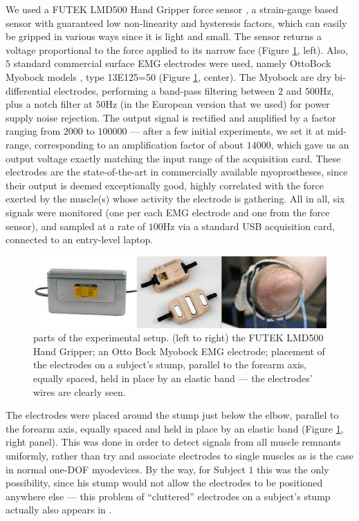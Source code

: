 We used a FUTEK LMD500 Hand Gripper force sensor \cite{futek}, a strain-gauge
based sensor with guaranteed low non-linearity and hysteresis factors, which can easily
be gripped in various ways since it is light and small. The sensor returns a
voltage proportional to the force applied to its narrow face (Figure \ref{fig:setup}, left).
Also, $5$ standard commercial surface EMG electrodes were used, namely OttoBock
Myobock models \cite{myobock}, type 13E125=50 (Figure \ref{fig:setup}, center).
The Myobock are dry bi-differential electrodes, performing a band-pass filtering between
$2$ and $500$Hz, plus a notch filter at $50$Hz (in the European version
that we used) for power supply noise rejection. The output signal is rectified
and amplified by a factor ranging from $2 000$ to $100 000$ --- after a few initial
experiments, we set it at mid-range, corresponding to an amplification factor of
about $14 000$, which gave us an output voltage exactly matching the input range of
the acquisition card.
These electrodes are the state-of-the-art in commercially available myoprostheses,
since their output is deemed exceptionally good, highly correlated with the
force exerted by the muscle(s) whose activity the electrode is gathering.
All in all, six signals were monitored (one per each EMG electrode and one from the
force sensor), and sampled at a rate of $100$Hz via a standard USB acquisition card,
connected to an entry-level laptop.

\begin{figure}[!ht] \centering
  \includegraphics[width=\textwidth]{figs/setup}
  \caption{parts of the experimental setup. (left to right) the FUTEK LMD500
    Hand Gripper; an Otto Bock Myobock EMG electrode; placement of the electrodes
    on a subject's stump, parallel to the forearm axis, equally spaced, held in
    place by an elastic band --- the electrodes' wires are clearly seen.}
  \label{fig:setup}
\end{figure}

The electrodes were placed around the stump just below the elbow, parallel
to the forearm axis, equally spaced and held in place by an elastic band
(Figure \ref{fig:setup}, right panel). This was done
in order to detect signals from all muscle remnants uniformly,
rather than try and associate electrodes to single muscles
as is the case in normal one-DOF myodevices. By the way, for Subject $1$
this was the only possibility, since his stump
would not allow the electrodes to be positioned anywhere else --- this problem
of ``cluttered'' electrodes on a subject's stump actually also appears in
\cite{sebelius}.

